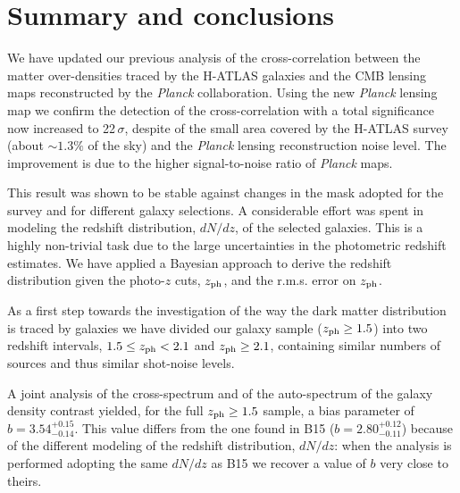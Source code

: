 
\section{Summary and conclusions}
\label{sec:conclusions}

We have updated our previous analysis of the cross-correlation between the matter over-densities traced by the H-ATLAS galaxies and the CMB lensing maps reconstructed by the \textit{Planck} collaboration. Using the new \textit{Planck} lensing map we confirm the detection of the cross-correlation with a total significance now increased to 22$\,\sigma$, despite of the small area covered by the H-ATLAS survey (about $\sim 1.3\%$ of the sky) and the \emph{Planck} lensing reconstruction noise level. The improvement is due to the higher signal-to-noise ratio of \textit{Planck} maps.

This result was shown to be stable against changes in the mask adopted for the survey and for different galaxy selections. A considerable effort was spent in modeling the redshift distribution, $dN/dz$, of the selected galaxies. This is a highly non-trivial task due to the large  uncertainties in the photometric redshift estimates. We have applied a Bayesian approach to derive the redshift distribution given the photo-$z$ cuts, $z_{\rm{ph}}$, and the r.m.s. error on $z_{\rm{ph}}$.

As a first step towards the investigation of the way the dark matter distribution is traced by
galaxies we have divided our galaxy sample  ($z_{\rm{ph}} \ge 1.5$) into two redshift intervals, $1.5 \le z_{\rm{ph}} < 2.1$ and $z_{\rm{ph}} \ge 2.1$, containing similar numbers of sources  and thus similar shot-noise levels.

A joint analysis of the cross-spectrum and of the auto-spectrum of the galaxy density contrast yielded, for the full $z_{\rm{ph}}\ge 1.5$ sample, a bias parameter of $b = 3.54^{+0.15}_{-0.14}$. This value differs from the one found in B15 ($b=2.80^{+0.12}_{-0.11}$) because of the different modeling of the redshift distribution, $dN/dz$: when the analysis is performed adopting the same $dN/dz$ as B15 we recover a value of $b$ very close to theirs.

